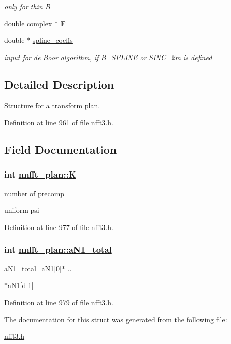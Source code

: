 \begin{CompactItemize}
\begin{CompactList}\small\item\em only for thin B \item\end{CompactList}\item 
\hypertarget{structnnfft__plan_o24}{
double complex $\ast$ {\bf F}}
\label{structnnfft__plan_o24}

\item 
\hypertarget{structnnfft__plan_o25}{
double $\ast$ \hyperlink{structnnfft__plan_o25}{spline\_\-coeffs}}
\label{structnnfft__plan_o25}

\begin{CompactList}\small\item\em input for de Boor algorithm, if B\_\-SPLINE or SINC\_\-2m is defined \item\end{CompactList}\end{CompactItemize}


\subsection{Detailed Description}
Structure for a transform plan. 



Definition at line 961 of file nfft3.h.

\subsection{Field Documentation}
\hypertarget{structnnfft__plan_o12}{
\subsubsection[K]{\setlength{\rightskip}{0pt plus 5cm}int \hyperlink{structnnfft__plan_o12}{nnfft\_\-plan::K}}}
\label{structnnfft__plan_o12}


number of precomp 

uniform psi 

Definition at line 977 of file nfft3.h.\hypertarget{structnnfft__plan_o13}{
\subsubsection[aN1\_\-total]{\setlength{\rightskip}{0pt plus 5cm}int \hyperlink{structnnfft__plan_o13}{nnfft\_\-plan::a\-N1\_\-total}}}
\label{structnnfft__plan_o13}


a\-N1\_\-total=a\-N1\mbox{[}0\mbox{]}$\ast$ .. 

$\ast$a\-N1\mbox{[}d-1\mbox{]} 

Definition at line 979 of file nfft3.h.

The documentation for this struct was generated from the following file:\begin{CompactItemize}
\item 
\hyperlink{nfft3_8h}{nfft3.h}\end{CompactItemize}
